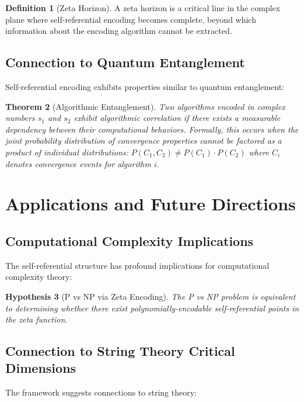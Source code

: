 \documentclass[12pt]{article}
\theoremstyle{plain}
\newtheorem{theorem}{Theorem}[section]
\newtheorem{hypothesis}[theorem]{Hypothesis}
\theoremstyle{definition}
\newtheorem{definition}[theorem]{Definition}
\begin{document}
\begin{definition}[Zeta Horizon]
A zeta horizon is a critical line in the complex plane where self-referential encoding becomes complete, beyond which information about the encoding algorithm cannot be extracted.
\end{definition}

\subsection{Connection to Quantum Entanglement}

Self-referential encoding exhibits properties similar to quantum entanglement:

\begin{theorem}[Algorithmic Entanglement]
Two algorithms encoded in complex numbers $s_1$ and $s_2$ exhibit algorithmic correlation if there exists a measurable dependency between their computational behaviors. Formally, this occurs when the joint probability distribution of convergence properties cannot be factored as a product of individual distributions: $P(C_1, C_2) \neq P(C_1) \cdot P(C_2)$ where $C_i$ denotes convergence events for algorithm $i$.
\end{theorem}

\section{Applications and Future Directions}

\subsection{Computational Complexity Implications}

The self-referential structure has profound implications for computational complexity theory:

\begin{hypothesis}[P vs NP via Zeta Encoding]
The P vs NP problem is equivalent to determining whether there exist polynomially-encodable self-referential points in the zeta function.
\end{hypothesis}

\subsection{Connection to String Theory Critical Dimensions}

The framework suggests connections to string theory:
\end{document}
